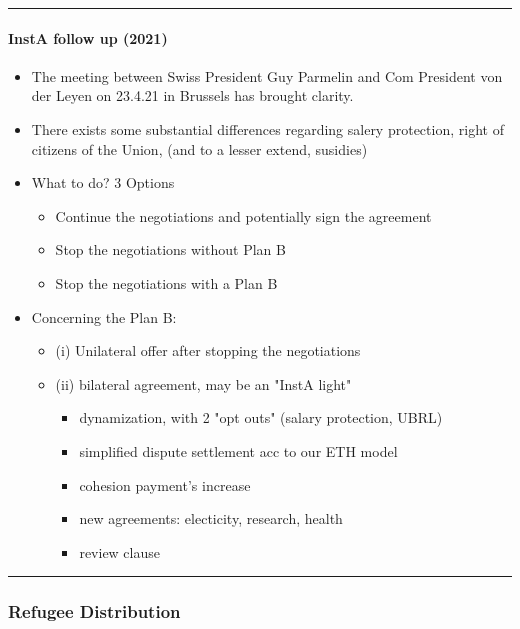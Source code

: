 \hrule

\paragraph{InstA follow up (2021)}

\begin{itemize}
    \item The meeting between Swiss President Guy Parmelin and Com President
        von der Leyen on 23.4.21 in Brussels has brought clarity.
    \item There exists some substantial differences regarding salery protection,
        right of citizens of the Union, (and to a lesser extend, susidies)
    \item What to do? 3 Options
        \begin{itemize}
            \item Continue the negotiations and potentially sign the agreement
            \item Stop the negotiations without Plan B
            \item Stop the negotiations with a Plan B
        \end{itemize}
    \item Concerning the Plan B:
        \begin{itemize}
            \item (i) Unilateral offer after stopping the negotiations
            \item (ii) bilateral agreement, may be an "InstA light"
                \begin{itemize}
                    \item dynamization, with 2 "opt outs" (salary protection, UBRL)
                    \item simplified dispute settlement acc to our ETH model
                    \item cohesion payment's increase
                    \item new agreements: electicity, research, health
                    \item review clause
                \end{itemize}
        \end{itemize}
\end{itemize}


\hrule


\subsubsection{Refugee Distribution}

